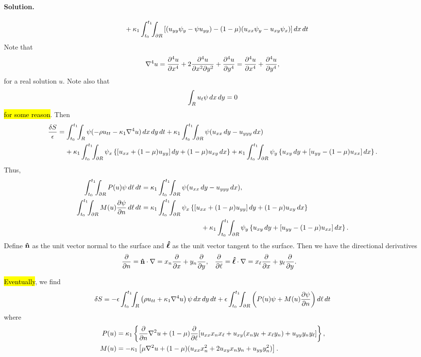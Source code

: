 \documentclass[11pt]{article}
\newcommand{\beq}{\begin{equation*}}
\newcommand{\eeq}{\end{equation*}}
\newenvironment{solution}
{
    \paragraph{Solution.}
    \ignorespaces
}
{
}
\begin{document}
\begin{solution}
\begin{align*}
		&\phantom{=\ } + \kappa_1 \int_{t_0}^{t_1} \!\!\int_{\partial R} \left[ (u_{yy} \psi_{y} - \psi u_{yy}) - (1 - \mu) (u_{xx} \psi_{y} - u_{xy} \psi_{x}) \right] \dd{x} \dd{t} \\
	\end{align*}
	Note that
	\beq
		\lapw u = \pdv[4]{u}{x} + 2 \frac{\partial^4 u}{\partial x^2 \partial y^2} + \pdv[4]{u}{y} = \pdv[4]{u}{x} + \pdv[4]{u}{y},
	\eeq
	for a real solution $u$.  Note also that
	\beq
		\intr \ut \psi \dd{x} \dd{y} = 0
	\eeq
	\hl{for some reason}.  Then
	\begin{align} \label{final}
		\frac{\dS}{\eps} &= \inttr \psi (-\rho \utt - \kaq \lapw u) \drt + \kaq \inttdr \psi (\uxx \dd{y} - \uyyy \dd{x}) \\
		&\phantom{=\ } + \kaq \inttdr \psix \left\{ [\uxx + (1 - \mu) \uyy] \dd{y} + (1 - \mu) \uxy \dd{x} \right\} + \kaq \inttdr \psiy \left\{ \uxy \dd{y} + [\uyy - (1 - \mu) \uxx] \dd{x} \right\}. \notag
	\end{align}
	Thus,
	\begin{align*}
		\inttdr \Pu \psi \dlt &= \kaq \inttdr \psi (\uxx \dd{y} - \uyyy \dd{x}), \\
		\inttdr \Mu \pdv{\psi}{n} \dlt &= \kaq \inttdr \psix \left\{ [\uxx + (1 - \mu) \uyy] \dd{y} + (1 - \mu) \uxy \dd{x} \right\} \\
		&\phantom{mmmmmmmmmm} + \kaq \inttdr \psiy \left\{ \uxy \dd{y} + [\uyy - (1 - \mu) \uxx] \dd{x} \right\}.
	\end{align*}
	Define $\mathbf{\hat{n}}$ as the unit vector normal to the surface and $\boldsymbol{\hat{\ell}}$ as the unit vector tangent to the surface.  Then we have the directional derivatives
	\begin{align*}
		\pdv{}{n} &= \mathbf{\hat{n}} \cdot \nabla = x_n \pdv{}{x} + y_n \pdv{}{y}, &
		\pdv{}{\ell} &= \boldsymbol{\hat{\ell}} \cdot \nabla = x_\ell \pdv{}{x} + y_\ell \pdv{}{y}.
	\end{align*}
	
	\hl{Eventually}, we find
	\beq
		\dS = -\eps \inttr \left(\rho \utt + \kaq \lapw u \right) \psi \drt + \eps \inttdr \left( \Pu \psi + \Mu \pdv{\psi}{n} \right) \dlt
	\eeq
	where
	\begin{align*}
		P(u) &= \kappa_1 \left\{ \pdv{}{n} \nabla^2 u + (1 - \mu) \pdv{}{\ell} [u_{xx} x_n x_\ell + u_{xy} (x_n y_\ell + x_\ell y_n) + u_{yy} y_n y_\ell] \right\}, \\
		M(u) &= -\kappa_1 \left[ \mu \nabla^2 u + (1 - \mu) (u_{xx} x_n^2 + 2 u_{xy} x_n y_n + u_{yy} y_n^2) \right].
	\end{align*}


\end{solution}
\end{document}
